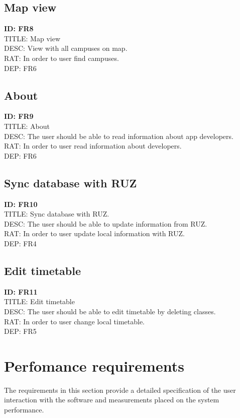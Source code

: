\documentclass{scrreprt}
\begin{document}
\subsection{Map view}
\textbf{ID: FR8}\\
TITLE: Map view\\
DESC: View with all campuses on map. \\
RAT: In order to user find campuses.\\
DEP: FR6

\subsection{About}
\textbf{ID: FR9}\\
TITLE: About\\
DESC: The user should be able to read information about app developers.\\
RAT: In order to user read information about developers.\\
DEP: FR6

\subsection{Sync database with RUZ}
\textbf{ID: FR10}\\
TITLE: Sync database with RUZ.\\
DESC: The user should be able to update information from RUZ.\\
RAT: In order to user update local information with RUZ.\\
DEP: FR4

\subsection{Edit timetable}
\textbf{ID: FR11}\\
TITLE: Edit timetable\\
DESC: The user should be able to edit timetable by deleting classes.\\
RAT: In order to user change local timetable.\\
DEP: FR5

\section{Perfomance requirements}
The requirements in this section provide a detailed specification of the user interaction with the software
and measurements placed on the system performance. 
\end{document}
